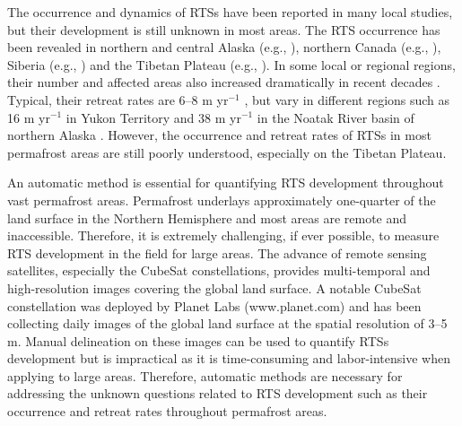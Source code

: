\documentclass[authoryear,preprint,review,12pt]{elsarticle}
\begin{document}
The occurrence and dynamics of RTSs have been reported in many local studies, but their development is still unknown in most areas. 
The RTS occurrence has been revealed in northern and central Alaska (e.g., \citealp{swanson2018growth,balser2014timing}), northern Canada (e.g., \citealp{burn1990canadian, cassidy2017impacts, armstrong2018thaw,lewkowicz2019extremes}), Siberia (e.g., \citealp{leibman2003dynamics, zwieback2018sub}) and the Tibetan Plateau (e.g., \citealp{niu2005engineering, niu2016thaw}). 
In some local or regional regions, their number and affected areas also increased dramatically in recent decades \citep{luo2019recent, lewkowicz2019extremes}.
Typical, their retreat rates are 6--8 m yr$^{-1}$ \citep{jorgenson_thermokarst_2013}, but vary in different regions such as 16 m yr$^{-1}$ in Yukon Territory \citep{burn1989geomorphology} and 38 m yr$^{-1}$  in the Noatak River basin of northern  Alaska \citep{swanson2018growth}.
However, the occurrence and retreat rates of RTSs in most permafrost areas are still poorly understood, especially on the Tibetan Plateau. 

An automatic method is essential for quantifying RTS development throughout vast permafrost areas. 
Permafrost underlays approximately one-quarter of the land surface in the Northern Hemisphere \citep{zhang1999statistics} and most areas are remote and inaccessible. %
Therefore, it is extremely challenging, if ever possible, to measure RTS development in the field for large areas. %
The advance of remote sensing satellites, especially the CubeSat constellations, provides multi-temporal and high-resolution images covering the global land surface. 
A notable CubeSat constellation was deployed by Planet Labs (www.planet.com) and has been collecting daily images of the global land surface at the spatial resolution of 3--5 m.
Manual delineation on these images can be used to quantify RTSs development but is impractical as it is time-consuming and labor-intensive when applying to large areas. %
Therefore, automatic methods are necessary for addressing the unknown questions related to RTS development such as their occurrence and retreat rates throughout permafrost areas. 
\end{document}
